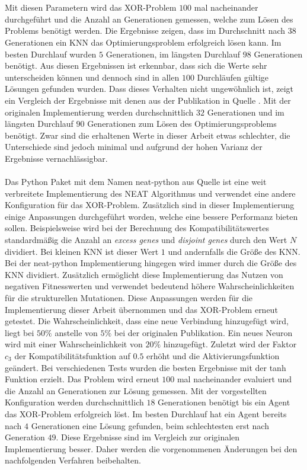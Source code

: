 \\\\ %
Mit diesen Parametern wird das XOR-Problem $100$ mal nacheinander durchgeführt und die Anzahl an Generationen gemessen, welche zum Lösen des Problems benötigt werden. Die Ergebnisse zeigen, dass im Durchschnitt nach $38$ Generationen ein \ac{KNN} das Optimierungsproblem erfolgreich lösen kann. Im besten Durchlauf wurden $5$ Generationen, im längsten Durchlauf $98$ Generationen benötigt. Aus diesen Ergebnissen ist erkennbar, dass sich die Werte sehr unterscheiden können und dennoch sind in allen $100$ Durchläufen gültige Lösungen gefunden wurden. Dass dieses Verhalten nicht ungewöhnlich ist, zeigt ein Vergleich der Ergebnisse mit denen aus der Publikation in Quelle \cite{stanley2002evolving}. Mit der originalen Implementierung werden durchschnittlich $32$ Generationen und im längsten Durchlauf $90$ Generationen zum Lösen des Optimierungsproblems benötigt. Zwar sind die erhaltenen Werte in dieser Arbeit etwas schlechter, die Unterschiede sind jedoch minimal und aufgrund der hohen Varianz der Ergebnisse vernachlässigbar.
\\\\
Das Python Paket mit dem Namen neat-python aus Quelle \cite{mcintyre_neatpython} ist eine weit verbreitete Implementierung des \ac{NEAT} Algorithmus und verwendet eine andere Konfiguration für das XOR-Problem. Zusätzlich sind in dieser Implementierung einige Anpassungen durchgeführt worden, welche eine bessere Performanz bieten sollen. Beispielsweise wird bei der Berechnung des Kompatibilitätswertes standardmäßig die Anzahl an \emph{excess genes} und \emph{disjoint genes} durch den Wert $N$ dividiert. Bei kleinen \ac{KNN} ist dieser Wert $1$ und andernfalls die Größe des \ac{KNN}. Bei der neat-python Implementierung hingegen wird immer durch die Größe des \ac{KNN} dividiert. Zusätzlich ermöglicht diese Implementierung das Nutzen von negativen Fitnesswerten und verwendet bedeutend höhere Wahrscheinlichkeiten für die strukturellen Mutationen. Diese Anpassungen werden für die Implementierung dieser Arbeit übernommen und das XOR-Problem erneut getestet. Die Wahrscheinlichkeit, dass eine neue Verbindung hinzugefügt wird, liegt bei $50\%$ anstelle von $5\%$ bei der originalen Publikation. Ein neues Neuron wird mit einer Wahrscheinlichkeit von $20\%$ hinzugefügt. Zuletzt wird der Faktor $c_3$ der Kompatibilitätsfunktion auf $0.5$ erhöht und die Aktivierungsfunktion geändert. Bei verschiedenen Tests wurden die besten Ergebnisse mit der \ac{tanh} Funktion erzielt. Das Problem wird erneut $100$ mal nacheinander evaluiert und die Anzahl an Generationen zur Lösung gemessen. Mit der vorgestellten Konfiguration werden durchschnittlich $18$ Generationen benötigt bis ein Agent das XOR-Problem erfolgreich löst. Im besten Durchlauf hat ein Agent bereits nach $4$ Generationen eine Lösung gefunden, beim schlechtesten erst nach Generation $49$. Diese Ergebnisse sind im Vergleich zur originalen Implementierung besser. Daher werden die vorgenommenen Änderungen bei den nachfolgenden Verfahren beibehalten.
